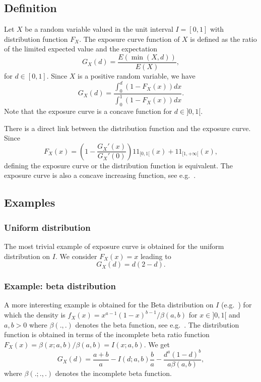 \documentclass[article, nojss]{jss}
\newcommand{\ind}{1\!\!1}
\begin{document}
\subsection{Definition}
Let $X$ be a random variable valued in the unit interval $I=[0,1]$ with distribution function $F_X$.
The exposure curve function of $X$ is defined as the ratio of the limited expected value and the expectation
$$
G_X(d) = \frac{E(\min(X,d))}{E(X)}, 
$$
for $d\in [0,1]$.
Since $X$ is a positive random variable, we have
$$
G_X(d) = \frac{\int_0^d (1-F_X(x))dx }{\int_0^1 (1-F_X(x))dx }.
$$
Note that the exposure curve is a concave function for $d\in]0,1[$. 

There is a direct link between the distribution function and the exposure curve.
Since 
$$
F_X(x) = \left(1- \frac{G_X'(x)}{G_X'(0)}\right)\ind_{[0,1[}(x) + \ind_{[1,+\infty[}(x),
$$
defining the exposure curve or the distribution function is equivalent.
The exposure curve is also a concave increasing function, see e.g.~\cite{antal03}.

\subsection{Examples}

\subsubsection{Uniform distribution}
\label{sec:unif}

The most trivial example of exposure curve is obtained for the uniform distribution on $I$.
We consider $F_X(x)=x$ leading to
$$
G_X(d) 
= d(2-d).
$$

\subsubsection{Example: beta distribution}
\label{sec:beta}

A more interesting example is obtained for the Beta distribution on $I$ 
(e.g.~\cite{kotzjohnsonbalak94v2})
for which the density is $f_X(x) = x^{a-1}(1-x)^{b-1}/\beta(a,b)$ for $x\in ]0,1[$ and $a,b>0$
where $\beta(.,.)$ denotes the 
beta function, see e.g.~\cite{nist10}.
The distribution function is obtained in terms of the incomplete beta ratio function 
$F_X(x) = \beta(x;a,b)/\beta(a,b) = I(x;a,b)$.
We get
$$
G_X(d) %
= \frac{a+b}{a} - I(d;a,b) \frac{b}{a} - \frac{d^a(1-d)^b}{a\beta(a,b)},
$$
where $\beta(.;.,.)$ denotes the incomplete beta function.
\end{document}
